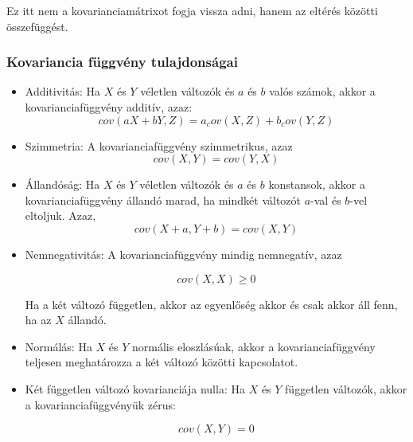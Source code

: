 \documentclass[11pt,a4paper]{article}
\begin{document}
				Ez itt nem a kovarianciamátrixot fogja vissza adni, hanem az eltérés közötti összefüggést.
				\subsubsection{Kovariancia függvény tulajdonságai}
					\begin{itemize}
					\item Additivitás: Ha $X$ és $Y$ véletlen változók és $a$ és $b$ valós számok, akkor a kovarianciafüggvény additív, azaz:
					$$cov(aX + bY, Z) = a_cov(X, Z) + b_cov(Y, Z)$$
					
					\item Szimmetria: A kovarianciafüggvény szimmetrikus, azaz
					$$cov(X,Y) = cov(Y,X)$$
					
					\item Állandóság: Ha $X$ és $Y$ véletlen változók és $a$ és $b$ konstansok, akkor a kovarianciafüggvény állandó marad, ha mindkét változót $a$-val és $b$-vel eltoljuk. Azaz,
					$$cov(X + a, Y + b) = cov(X, Y)$$
					
					\item Nemnegativitás: A kovarianciafüggvény mindig nemnegatív, azaz
					
					$$cov(X, X) \ge 0$$
					
					Ha a két változó független, akkor az egyenlőség akkor és csak akkor áll fenn, ha az $X$ állandó.
					
					\item Normálás: Ha $X$ és $Y$ normális eloszlásúak, akkor a kovarianciafüggvény teljesen meghatározza a két változó közötti kapcsolatot.
					
					\item Két független változó kovarianciája nulla: Ha $X$ és $Y$ független változók, akkor a kovarianciafüggvényük zérus:
					
					$$cov(X, Y) = 0$$
					\end{itemize}
\end{document}
